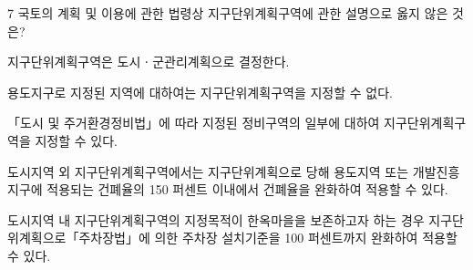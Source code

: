 \begin{question}{7}
국토의 계획 및 이용에 관한 법령상 지구단위계획구역에 관한 설명으로 옳지 않은 것은?
\begin{choices}
  \item 지구단위계획구역은 도시ㆍ군관리계획으로 결정한다.
  \item 용도지구로 지정된 지역에 대하여는 지구단위계획구역을 지정할 수 없다.
  \item 「도시 및 주거환경정비법」에 따라 지정된 정비구역의 일부에 대하여 지구단위계획구역을 지정할 수 있다.
  \item 도시지역 외 지구단위계획구역에서는 지구단위계획으로 당해 용도지역 또는 개발진흥지구에 적용되는 건폐율의 150 퍼센트 이내에서 건폐율을 완화하여 적용할 수 있다.
  \item 도시지역 내 지구단위계획구역의 지정목적이 한옥마을을 보존하고자 하는 경우 지구단위계획으로「주차장법」에 의한 주차장 설치기준을 100 퍼센트까지 완화하여 적용할 수 있다.
\end{choices}
\end{question}
